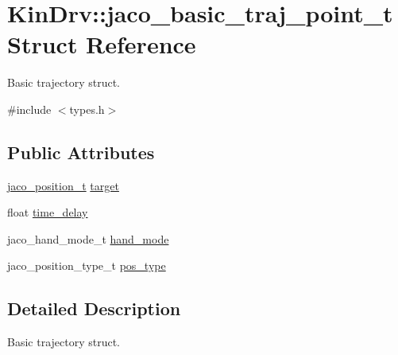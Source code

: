 \hypertarget{structKinDrv_1_1jaco__basic__traj__point__t}{\section{Kin\+Drv\+:\+:jaco\+\_\+basic\+\_\+traj\+\_\+point\+\_\+t Struct Reference}
\label{structKinDrv_1_1jaco__basic__traj__point__t}
}


Basic trajectory struct.  




{\ttfamily \#include $<$types.\+h$>$}

\subsection*{Public Attributes}
\begin{DoxyCompactItemize}
\item 
\hyperlink{structKinDrv_1_1jaco__position__t}{jaco\+\_\+position\+\_\+t} \hyperlink{structKinDrv_1_1jaco__basic__traj__point__t_a254d00317a52c42023f94d7eea3cabf2}{target}
\item 
float \hyperlink{structKinDrv_1_1jaco__basic__traj__point__t_aee676deaacd7cdacdf832a9953e81605}{time\+\_\+delay}
\item 
jaco\+\_\+hand\+\_\+mode\+\_\+t \hyperlink{structKinDrv_1_1jaco__basic__traj__point__t_a6ddcd7dd2d669ba0a6ab83101276c9bc}{hand\+\_\+mode}
\item 
jaco\+\_\+position\+\_\+type\+\_\+t \hyperlink{structKinDrv_1_1jaco__basic__traj__point__t_ae97f90e3b59790cc972512b61cab491c}{pos\+\_\+type}
\end{DoxyCompactItemize}


\subsection{Detailed Description}
Basic trajectory struct. 

